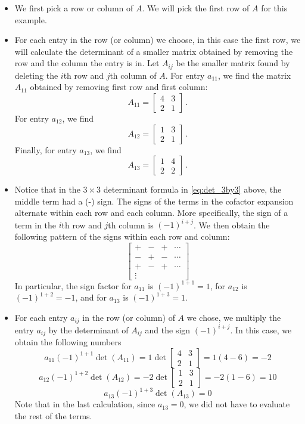 \begin{itemize}
\item We first pick a row or column of $A$. We will pick the first row of $A$ for this example.

\item For each entry in the row (or column) we choose, in this case the first row, we will calculate the determinant of a smaller matrix obtained by removing the row and the column the entry is in. Let $A_{ij}$ be the smaller matrix found by deleting the $i$th row and $j$th column of $A$. For entry $a_{11}$, we find the matrix $A_{11}$ obtained by removing first row and first column:
\[A_{11} = \left[ \begin{array}{cc} 4 & 3 \\ 2 & 1 \end{array} \right]\, .\]
For entry $a_{12}$, we find
\[ A_{12} = \left[ \begin{array}{cc} 1 & 3 \\ 2 & 1 \end{array} \right]\, .\] 
Finally, for entry $a_{13}$, we find
\[ A_{13} = \left[ \begin{array}{cc} 1 & 4 \\ 2 & 2 \end{array} \right] \, .\]

\item Notice that in the $3 \times 3$ determinant formula in \eqref{eq:det_3by3} above, the middle term had a (-) sign. The signs of the terms in the cofactor expansion alternate within each row and each column. More specifically, the sign of a term in the $i$th row and $j$th column is $(-1)^{i+j}$. We then obtain the following pattern of the signs within each row and column:
\[ \left[ \begin{array}{cccc} + & - & + & \cdots \\ - & + & - & \cdots \\ + & - & + & \cdots \\ \vdots & & & \end{array} \right] \]
In particular, the sign factor for $a_{11}$ is $(-1)^{1+1}=1$, for $a_{12}$ is $(-1)^{1+2}=-1$, and for $a_{13}$ is $(-1)^{1+3}=1$. 

\item For each entry $a_{ij}$ in the row (or column) of $A$ we chose, we multiply the entry $a_{ij}$ by the determinant of $A_{ij}$ and the sign $(-1)^{i+j}$. In this case, we obtain the following numbers
\[ a_{11} (-1)^{1+1} \det(A_{11})  = 1 \det \left[ \begin{array}{cc} 4 & 3 \\ 2 & 1 \end{array} \right] = 1(4-6)=-2 \]
\[ a_{12} (-1)^{1+2} \det(A_{12}) = -2 \det \left[ \begin{array}{cc} 1 & 3 \\ 2 & 1 \end{array} \right] = -2(1-6)=10 \]
\[ a_{13} (-1)^{1+3} \det(A_{13}) = 0 \]
Note that in the last calculation, since $a_{13}=0$, we did not have to evaluate the rest of the terms.


\end{itemize}
